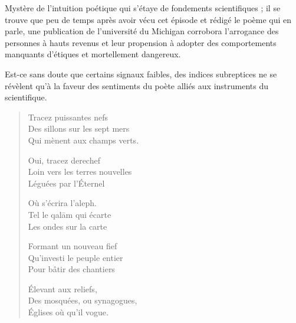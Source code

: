 \begin{prose}

  Mystère de l’intuition poétique qui s’étaye de fondements scientifiques ; il se trouve que peu de temps après avoir vécu cet épisode et rédigé le poème qui en parle, une publication de l’université du Michigan corrobora l’arrogance des personnes à hauts revenus et leur propension à adopter des comportements manquants d’étiques et mortellement dangereux.

  Est-ce sans doute que certains signaux faibles, des indices subreptices ne se révèlent qu’à la faveur des  sentiments du poète alliés aux instruments du scientifique.
\end{prose}

\begin{verse}\tercet
  Tracez puissantes nefs\\ 
  Des sillons sur les sept mers\\ 
  Qui mènent aux champs verts.  %

  Oui, tracez derechef\\ 
  Loin vers les terres  nouvelles\\ 
  Léguées par l’Éternel  %

  Où s’écrira l’aleph.\\ 
  Tel le qalām qui écarte\\ 
  Les ondes sur la carte  %

  Formant un nouveau fief\\ 
  Qu’investi le peuple entier\\ 
  Pour bâtir des chantiers  %

  Élevant aux reliefs,\\ 
  Des mosquées, ou synagogues,\\ 
  Églises où qu’il vogue.  %
\end{verse}

